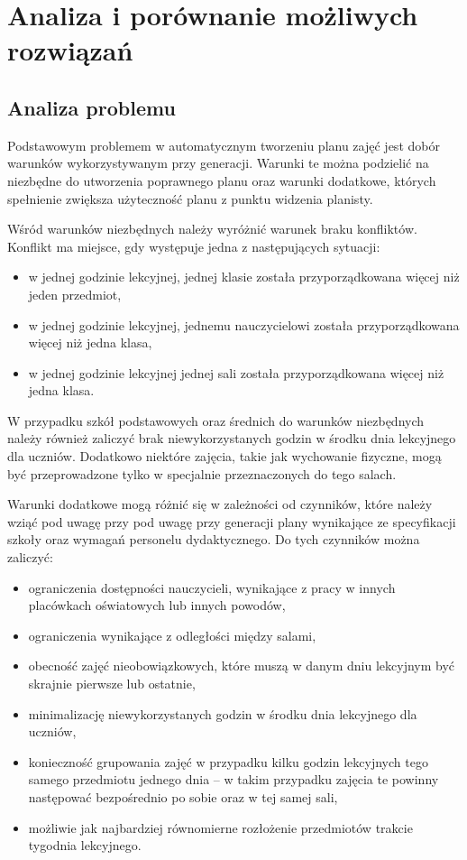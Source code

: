 \chapter{Analiza i porównanie możliwych rozwiązań}
\section{Analiza problemu}
Podstawowym problemem w automatycznym tworzeniu planu zajęć jest dobór warunków wykorzystywanym przy generacji. Warunki te można podzielić na niezbędne do utworzenia poprawnego planu oraz warunki dodatkowe, których spełnienie zwiększa użyteczność planu z punktu widzenia planisty. 

Wśród warunków niezbędnych należy wyróżnić warunek braku konfliktów. Konflikt ma miejsce, gdy występuje jedna z następujących sytuacji:
\begin{itemize}
    \item w jednej godzinie lekcyjnej, jednej klasie została przyporządkowana więcej niż jeden przedmiot,
    \item w jednej godzinie lekcyjnej, jednemu nauczycielowi została przyporządkowana więcej niż jedna klasa,
    \item w jednej godzinie lekcyjnej jednej sali została przyporządkowana więcej niż jedna klasa.
\end{itemize}
W przypadku szkół podstawowych oraz średnich do warunków niezbędnych należy również zaliczyć brak niewykorzystanych godzin w środku dnia lekcyjnego dla uczniów. Dodatkowo niektóre zajęcia, takie jak wychowanie fizyczne, mogą być przeprowadzone tylko w specjalnie przeznaczonych do tego salach.

Warunki dodatkowe mogą różnić się w zależności od czynników, które należy wziąć pod uwagę przy pod uwagę przy generacji plany wynikające ze specyfikacji szkoły oraz wymagań personelu dydaktycznego. Do tych czynników można zaliczyć:
\begin{itemize}
    \item ograniczenia dostępności nauczycieli, wynikające z pracy w innych placówkach oświatowych lub innych powodów,
    \item ograniczenia wynikające z odległości między salami,
    \item obecność zajęć nieobowiązkowych, które muszą w danym dniu lekcyjnym być skrajnie pierwsze lub ostatnie,
    \item  minimalizację niewykorzystanych godzin w środku dnia lekcyjnego dla uczniów,
    \item konieczność grupowania zajęć w przypadku kilku godzin lekcyjnych tego samego przedmiotu jednego dnia -- w takim przypadku zajęcia te powinny następować bezpośrednio po sobie oraz w tej samej sali,
    \item możliwie jak najbardziej równomierne rozłożenie przedmiotów trakcie tygodnia lekcyjnego.
\end{itemize}
